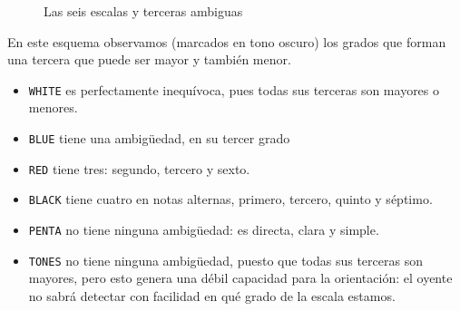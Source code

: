 \documentclass[]{article}
\providecommand{\tightlist}{%
  \setlength{
\itemsep}{0pt}\setlength{\parskip}{0pt}}
\begin{document}
\begin{figure}
\begin{subfigure}{0.15\textwidth}
\begin{tikzpicture}
    \end{tikzpicture}    
    \caption{}
    \label{fig:tikz2}
  \end{subfigure}
  \hfill
  \begin{subfigure}{0.15\textwidth}
    \centering
    \caption{}
    \label{fig:tikz2}
  \end{subfigure}
  \hfill
  \caption{Las seis escalas y terceras ambiguas}
  \label{fig:the-six-scales-and-ambiguous-thirds}
\end{figure}



En este esquema observamos (marcados en tono oscuro) los grados que forman una tercera que puede ser mayor y también menor.

\begin{itemize}   \tightlist
  \item  \texttt{WHITE} es perfectamente inequívoca, pues todas sus terceras         son mayores o menores.
  \item  \texttt{BLUE} tiene una ambigüedad, en su tercer grado
  \item  \texttt{RED} tiene tres: segundo, tercero y sexto.
  \item  \texttt{BLACK} tiene cuatro en notas alternas, primero, tercero,         quinto y séptimo.
  \item  \texttt{PENTA} no tiene ninguna ambigüedad: es directa, clara y         simple.
  \item  \texttt{TONES} no tiene ninguna ambigüedad, puesto que todas sus         terceras son mayores, pero esto genera una débil capacidad para la         orientación: el oyente no sabrá detectar con facilidad en qué grado de         la escala estamos.
\end{itemize}
\end{document}
